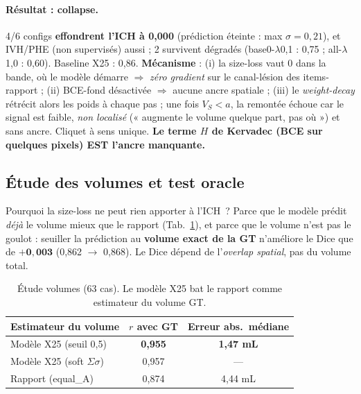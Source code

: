 \documentclass[11pt,a4paper]{article}
\begin{document}
\paragraph{Résultat : collapse.} 4/6 configs \textbf{effondrent l'ICH à 0,000}
(prédiction éteinte : max $\sigma=0{,}21$), et IVH/PHE (non supervisés) aussi ;
2 survivent dégradés (base0-$\lambda$0,1 : 0,75 ; all-$\lambda$1,0 : 0,60). Baseline X25 :
0,86. \textbf{Mécanisme} : (i) la size-loss vaut 0 dans la bande, où le modèle démarre
$\Rightarrow$ \emph{zéro gradient} sur le canal-lésion des items-rapport ; (ii) BCE-fond
désactivée $\Rightarrow$ aucune ancre spatiale ; (iii) le \emph{weight-decay} rétrécit alors
les poids à chaque pas ; une fois $V_S<a$, la remontée échoue car le signal est faible,
\emph{non localisé} (« augmente le volume quelque part, pas où ») et sans ancre. Cliquet à
sens unique. \textbf{Le terme $H$ de Kervadec (BCE sur quelques pixels) EST l'ancre
manquante.}

\subsection{Étude des volumes et test oracle}
\label{sec:vol}
Pourquoi la size-loss ne peut rien apporter à l'ICH~? Parce que le modèle prédit \emph{déjà}
le volume mieux que le rapport (Tab.~\ref{tab:vol}), et parce que le volume n'est pas le
goulot : seuiller la prédiction au \textbf{volume exact de la GT} n'améliore le Dice que de
$\mathbf{+0{,}003}$ (0,862 $\rightarrow$ 0,868). Le Dice dépend de l'\emph{overlap spatial},
pas du volume total.

\begin{table}[h]\centering
\caption{Étude volumes (63 cas). Le modèle X25 bat le rapport comme estimateur du volume GT.}
\label{tab:vol}
\begin{tabular}{lcc}
\toprule
Estimateur du volume & $r$ avec GT & Erreur abs.\ médiane \\
\midrule
Modèle X25 (seuil 0,5) & \textbf{0,955} & \textbf{1,47 mL} \\
Modèle X25 (soft $\Sigma\sigma$) & 0,957 & --- \\
Rapport (equal\_A) & 0,874 & 4,44 mL \\
\bottomrule
\end{tabular}
\end{table}
\end{document}
